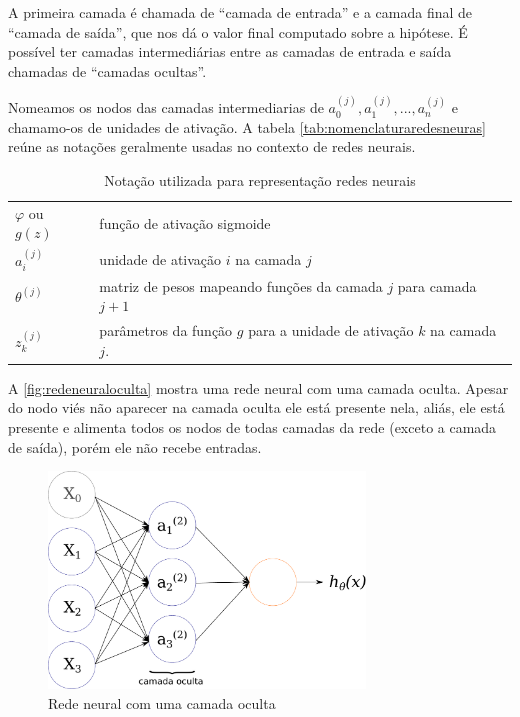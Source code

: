A primeira camada é chamada de ``camada de entrada'' e a camada final de ``camada de saída'', que nos dá o valor final computado sobre a hipótese. É possível ter camadas intermediárias entre as camadas de entrada e saída chamadas de ``camadas ocultas''. 

Nomeamos os nodos das camadas intermediarias de $a_0^{(j)}, a_1^{(j)}, ..., a_n^{(j)}$ e chamamo-os de unidades de ativação. A tabela \autoref{tab:nomenclaturaredesneuras} reúne as notações geralmente usadas no contexto de redes neurais.

\begin{table}[!htb]
\caption{Notação utilizada para representação redes neurais} \label{tab:nomenclaturaredesneuras}
\begin{center}
\begin{tabular}{m{2cm}m{12.0cm}}
  \toprule
  $\varphi$ ou $g(z)$ & função de ativação sigmoide\\
  $a_i^{(j)}$ 	   & unidade de ativação $i$ na camada $j$ \\
  $\theta^{(j)}$   & matriz de pesos mapeando funções da camada $j$ para camada $j+1$  \\
  $z_k^{(j)}$	&	parâmetros da função $g$ para a unidade de ativação $k$ na camada $j$. \\
  \bottomrule
\end{tabular}
\end{center}

\end{table}


A \autoref{fig:redeneuraloculta} mostra uma rede neural com uma camada oculta. Apesar do nodo viés não aparecer na camada oculta ele está presente nela, aliás, ele está presente e alimenta todos os nodos de todas camadas da rede (exceto a camada de saída), porém ele não recebe entradas.

\begin{figure}
\centering
\caption{Rede neural com uma camada oculta} \label{fig:redeneuraloculta}
\includegraphics[width=0.75\textwidth]{img/redeneuraloculta.pdf}
\end{figure}

